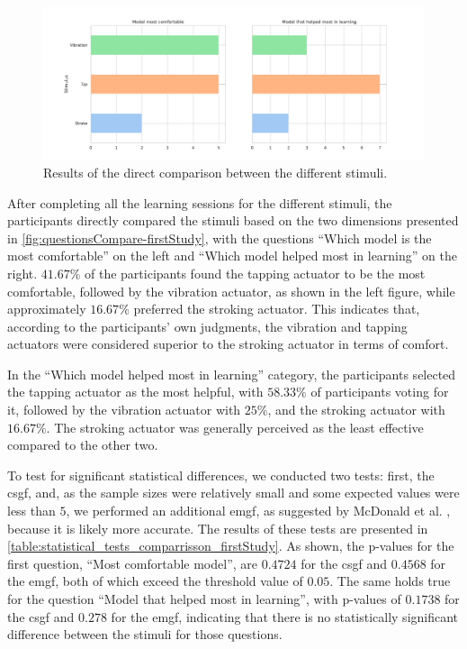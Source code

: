 \begin{figure}
    \centering
    \includegraphics[width=\linewidth]{src/pictures/Study1Data_questionnaire/questions_compare_study1.pdf}
    \caption{Results of the direct comparison between the different stimuli.}
    \label{fig:questionsCompare-firstStudy}
\end{figure}

After completing all the learning sessions for the different stimuli, the participants directly compared the stimuli based on the two dimensions presented in \autoref{fig:questionsCompare-firstStudy}, with the questions \enquote{Which model is the most comfortable} on the left and \enquote{Which model helped most in learning} on the right. 
$41.67\%$ of the participants found the tapping actuator to be the most comfortable, followed by the vibration actuator, as shown in the left figure, while approximately $16.67\%$ preferred the stroking actuator. This indicates that, according to the participants' own judgments, the vibration and tapping actuators were considered superior to the stroking actuator in terms of comfort.

In the \enquote{Which model helped most in learning} category, the participants selected the tapping actuator as the most helpful, with $58.33\%$ of participants voting for it, followed by the vibration actuator with $25\%$, and the stroking actuator with $16.67\%$. The stroking actuator was generally perceived as the least effective compared to the other two.

To test for significant statistical differences, we conducted two tests: first, the \gls{csgf}, and, as the sample sizes were relatively small and some expected values were less than $5$, we performed an additional \gls{emgf}, as suggested by McDonald et al. \cite{mcdonald2014handbook}, because it is likely more accurate. 
The results of these tests are presented in \autoref{table:statistical_tests_comparrisson_firstStudy}. 
As shown, the p-values for the first question, \enquote{Most comfortable model}, are $0.4724$ for the \gls{csgf} and $0.4568$ for the \gls{emgf}, both of which exceed the threshold value of $0.05$. 
The same holds true for the question \enquote{Model that helped most in learning}, with p-values of $0.1738$ for the \gls{csgf} and $0.278$ for the \gls{emgf}, indicating that there is no statistically significant difference between the stimuli for those questions.

